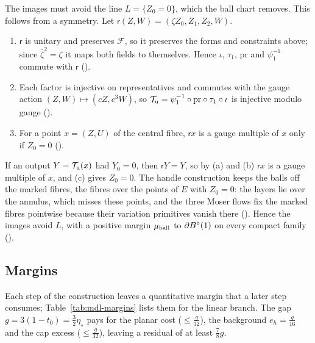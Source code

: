 The images must avoid the line $L=\{Z_0=0\}$, which the ball chart removes. This follows from a symmetry. Let
$\mathsf r(Z,W)=(\zeta Z_0,Z_1,Z_2,W)$.
\begin{enumerate}[label=(\alph*)]
\item $\mathsf r$ is unitary and preserves $\mathcal F$, so it preserves the forms and constraints above; since
 $\bar\zeta^2=\zeta$ it maps both fields to themselves. Hence $\iota$, $\tau_1$, $\mathrm{pr}$ and $\psi_1^{-1}$ commute with
 $\mathsf r$ ().
\item Each factor is injective on representatives and commutes with the gauge action $(Z,W)\mapsto(cZ,c^3W)$, so
 $\mathcal T_{\rm u}=\psi_1^{-1}\circ\mathrm{pr}\circ\tau_1\circ\iota$ is injective modulo gauge
 ().
\item For a point $x=(Z,U)$ of the central fibre, $\mathsf rx$ is a gauge multiple of $x$ only if $Z_0=0$
 ().
\end{enumerate}
If an output $Y=\mathcal T_{\rm u}(x)$ had $Y_0=0$, then $\mathsf rY=Y$, so by (a) and (b) $\mathsf rx$ is a gauge multiple
of $x$, and (c) gives $Z_0=0$. The handle construction
keeps the balls off the marked fibres, the fibres over the points of $E$ with $Z_0=0$: the layers lie over the
annulus, which misses these points, and the three Moser flows fix the marked fibres pointwise because their variation
primitives vanish there (). Hence the images avoid $L$, with a positive margin
$\mu_{\rm ball}$ to $\partial B^{\circ}(1)$ on every compact family ().

\subsection{Margins}\label{sec:mdl-margins}

Each step of the construction leaves a quantitative margin that a later step consumes; Table~\ref{tab:mdl-margins}
lists them for the linear branch. The gap $g=3(1-t_0)=\frac32\eta_\star$ pays for the planar cost ($\le\frac g{32}$),
the background $e_h=\frac g{16}$ and the cap excess ($\le\frac g{32}$), leaving a residual of at least $\frac78g$.

